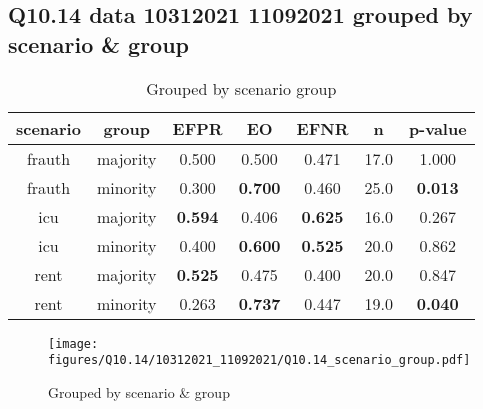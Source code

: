 \subsection{Q10.14 data 10312021 11092021 grouped by scenario \& group}

\begin{comment}
                        EFPR        EO      EFNR     n    pvalue
(frauth, majority)  0.500000  0.500000  0.470588  17.0  1.000000
(frauth, minority)  0.300000  0.700000  0.460000  25.0  0.013221
(icu, majority)     0.593750  0.406250  0.625000  16.0  0.266715
(icu, minority)     0.400000  0.600000  0.525000  20.0  0.861804
(rent, majority)    0.525000  0.475000  0.400000  20.0  0.846517
(rent, minority)    0.263158  0.736842  0.447368  19.0  0.040045
\end{comment}

\begin{table}[h]
    \centering
    \begin{tabular}{|c|c|c|c|c|c|c|}
        \hline
        scenario & group & EFPR & EO & EFNR & n & p-value\\
        \hline
        frauth & majority & 0.500 & 0.500 & 0.471 & 17.0 & 1.000\\
		frauth & minority & 0.300 & \textbf{0.700} & 0.460 & 25.0 & \textbf{0.013}\\
		icu & majority & \textbf{0.594} & 0.406 & \textbf{0.625} & 16.0 & 0.267\\
		icu & minority & 0.400 & \textbf{0.600} & \textbf{0.525} & 20.0 & 0.862\\
		rent & majority & \textbf{0.525} & 0.475 & 0.400 & 20.0 & 0.847\\
		rent & minority & 0.263 & \textbf{0.737} & 0.447 & 19.0 & \textbf{0.040}\\
		
        \hline
    \end{tabular}
    \caption{Grouped by scenario group}
    \label{tab:my_label}
\end{table}
\begin{figure}[h]
    \centering
    \texttt{[image: figures/Q10.14/10312021\_11092021/Q10.14\_scenario\_group.pdf]}
    \caption{Grouped by scenario \& group}
    \label{fig:my_label}
\end{figure}
